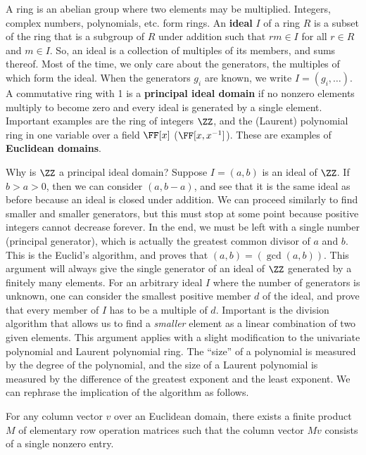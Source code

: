 A ring is an abelian group where two elements may be multiplied.
Integers, complex numbers, polynomials, etc. form rings.
An {\bf ideal} $I$ of a ring $R$ is a subset of the ring
that is a subgroup of $R$ under addition
such that $r m \in I $ for all $r \in R$ and $m \in I$.
So, an ideal is a collection of multiples of its members,
and sums thereof.
Most of the time, we only care about the generators,
the multiples of which form the ideal.
When the generators $g_i$ are known, we write $I = (g_i,\ldots)$.
A commutative ring with 1 is a {\bf principal ideal domain}
if no nonzero elements multiply to become zero 
and every ideal is generated by a single element.
Important examples are the ring of integers $\ZZ$,
and the (Laurent) polynomial ring in one variable over a field $\FF[x]$ ($\FF[x,x^{-1}]$).
These are examples of {\bf Euclidean domains}.

Why is $\ZZ$ a principal ideal domain?
Suppose $I = (a,b)$ is an ideal of $\ZZ$.
If $b > a > 0$, then we can consider $(a, b-a)$,
and see that it is the same ideal as before 
because an ideal is closed under addition.
We can proceed similarly to find smaller and smaller generators,
but this must stop at some point because positive integers cannot decrease forever.
In the end, we must be left with a single number (principal generator),
which is actually the greatest common divisor of $a$ and $b$.
This is the Euclid's algorithm, and proves that $(a,b) = (\gcd(a,b))$.
This argument will always give the single generator of 
an ideal of $\ZZ$ generated by a finitely many elements.
For an arbitrary ideal $I$ where the number of generators is unknown,
one can consider the smallest positive member $d$ of the ideal,
and prove that every member of $I$ has to be a multiple of $d$.
Important is the division algorithm 
that allows us to find a {\em smaller} element 
as a linear combination of two given elements.
This argument applies with a slight modification
to the univariate polynomial and Laurent polynomial ring.
The ``size'' of a polynomial is measured by the degree of the polynomial,
and the size of a Laurent polynomial is measured by
the difference of the greatest exponent and the least exponent.
We can rephrase the implication of the algorithm as follows.
\begin{prop}
For any column vector $v$ over an Euclidean domain,
there exists a finite product $M$ of elementary row operation matrices
such that the column vector $Mv$ consists of a single nonzero entry.
\end{prop}

